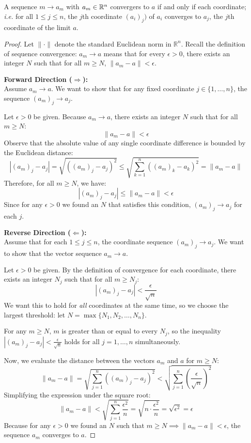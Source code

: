 \begin{proposition}
	A sequence $m \rightarrow a_m$ with $a_m \in \mathbb{R}^n$ convergers to $a$ if and only if each coordinate; \emph{i.e.} for all $1\le j\le n$, the $j$th coordinate  $(a_i)_j)$ of $a_i$ converges to $a_j$, the $j$th coordinate of the limit $a$.
\end{proposition}
\begin{proof}[Proof]
	Let $\| \cdot \|$ denote the standard Euclidean norm in $\mathbb{R}^n$. Recall the definition of sequence convergence: $a_m \to a$ means that for every $\epsilon > 0$, there exists an integer $N$ such that for all $m \ge N$, $\|a_m - a\| < \epsilon$.

	\vspace{1em}
	\noindent\textbf{Forward Direction ($\Rightarrow$):} \\
	Assume $a_m \to a$. We want to show that for any fixed coordinate $j \in \{1, \dots, n\}$, the sequence $(a_m)_j \to a_j$.

	Let $\epsilon > 0$ be given. Because $a_m \to a$, there exists an integer $N$ such that for all $m \ge N$:
	\[
		\|a_m - a\| < \epsilon
	\]
	Observe that the absolute value of any single coordinate difference is bounded by the Euclidean distance:
	\[
		|(a_m)_j - a_j| = \sqrt{((a_m)_j - a_j)^2} \le \sqrt{\sum_{k=1}^n ((a_m)_k - a_k)^2} = \|a_m - a\|
	\]
	Therefore, for all $m \ge N$, we have:
	\[
		|(a_m)_j - a_j| \le \|a_m - a\| < \epsilon
	\]
	Since for any $\epsilon > 0$ we found an $N$ that satisfies this condition, $(a_m)_j \to a_j$ for each $j$.

	\vspace{1em}
	\noindent\textbf{Reverse Direction ($\Leftarrow$):} \\
	Assume that for each $1 \le j \le n$, the coordinate sequence $(a_m)_j \to a_j$. We want to show that the vector sequence $a_m \to a$.

	Let $\epsilon > 0$ be given. By the definition of convergence for each coordinate, there exists an integer $N_j$ such that for all $m \ge N_j$:
	\[
		|(a_m)_j - a_j| < \frac{\epsilon}{\sqrt{n}}
	\]
	We want this to hold for \emph{all} coordinates at the same time, so we choose the largest threshold: let $N = \max\{N_1, N_2, \dots, N_n\}$.

	For any $m \ge N$, $m$ is greater than or equal to every $N_j$, so the inequality $|(a_m)_j - a_j| < \frac{\epsilon}{\sqrt{n}}$ holds for all $j=1, \dots, n$ simultaneously.

	Now, we evaluate the distance between the vectors $a_m$ and $a$ for $m \ge N$:
	\[
		\|a_m - a\| = \sqrt{\sum_{j=1}^n ((a_m)_j - a_j)^2} < \sqrt{\sum_{j=1}^n \left(\frac{\epsilon}{\sqrt{n}}\right)^2}
	\]
	Simplifying the expression under the square root:
	\[
		\|a_m - a\| < \sqrt{\sum_{j=1}^n \frac{\epsilon^2}{n}} = \sqrt{n \cdot \frac{\epsilon^2}{n}} = \sqrt{\epsilon^2} = \epsilon
	\]
	Because for any $\epsilon > 0$ we found an $N$ such that $m \ge N \implies \|a_m - a\| < \epsilon$, the sequence $a_m$ converges to $a$. 
\end{proof}

